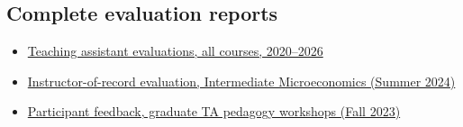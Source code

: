\documentclass[letter,11pt]{article}
\begin{document}
\subsection*{Complete evaluation reports}

\begin{itemize}
    \item \href{https://gagandeep-sachdeva.com/teaching/TA_Evals_All_2020_2026.pdf}{Teaching assistant evaluations, all courses, 2020--2026}
    \item \href{https://gagandeep-sachdeva.com/teaching/teachingevals_GSI.pdf}{Instructor-of-record evaluation, Intermediate Microeconomics (Summer 2024)}
    \item \href{https://gagandeep-sachdeva.com/teaching/Feedback\%20for\%20TA\%20Workshops-\%20Fall\%202023.pdf}{Participant feedback, graduate TA pedagogy workshops (Fall 2023)}
\end{itemize}

%   
%   
%   
\end{document}
